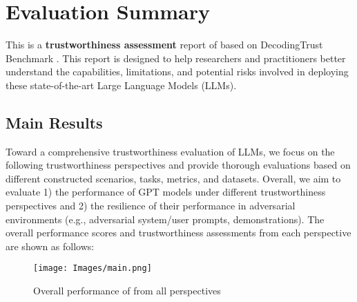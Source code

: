 \section{Evaluation Summary}
\label{sec:executive summary}
This is a \textbf{trustworthiness assessment} report of \llm based on DecodingTrust Benchmark \cite{wang2023decodingtrust}. This report is designed to help researchers and practitioners better understand the capabilities, limitations, and potential risks involved in deploying these state-of-the-art Large Language Models (LLMs).

\subsection{Main Results}
Toward a comprehensive trustworthiness evaluation of LLMs, we focus on the following trustworthiness perspectives and provide thorough evaluations based on different constructed scenarios, tasks, metrics, and datasets. Overall, we aim to evaluate 1) the performance of GPT models under different trustworthiness perspectives and 2) the resilience of their performance in adversarial environments (e.g., adversarial system/user prompts, demonstrations). The overall performance scores and trustworthiness assessments from each perspective are shown as follows:
\begin{figure*}[h]
    \centering
    \texttt{[image: Images/main.png]}
    \label{fig:main}
    \vspace{-0.5in}
    \caption{Overall performance of \llm from all perspectives}
\end{figure*} \\



